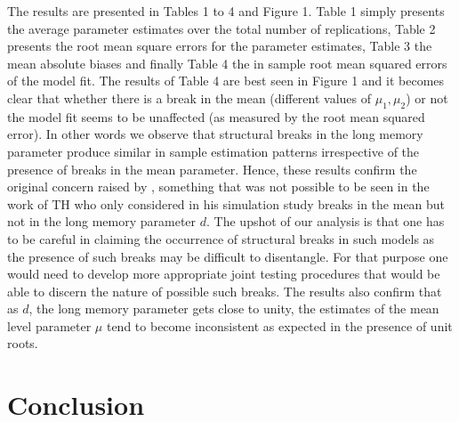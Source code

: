 \documentclass[11pt,fleqn]{article}
\begin{document}
{The results are presented in Tables 1 to 4 and Figure 1. Table 1 simply
presents the average parameter estimates over the total number of
replications, Table 2 presents the root mean square errors for the parameter
estimates, Table 3 the mean absolute biases and finally Table 4 the in
sample root mean squared errors of the model fit. The results of Table 4 are
best seen in Figure 1 and it becomes clear that whether there is a break in
the mean (different values of $\mu _{1},\mu _{2}$) or not the model fit
seems to be unaffected (as measured by the root mean squared error). In
other words we observe that structural breaks in the long memory parameter
produce similar in sample estimation patterns irrespective of the presence
of breaks in the mean parameter. Hence, these results confirm the original
concern raised by \cite{Diebold2001}, something that was not possible to be
seen in the work of TH who only considered in his simulation study breaks in
the mean but not in the long memory parameter $d.$ The upshot of our
analysis is that one has to be careful in claiming the occurrence of
structural breaks in such models as the presence of such breaks may be
difficult to disentangle. For that purpose one would need to develop more
appropriate joint testing procedures that would be able to discern the
nature of possible such breaks. The results also confirm that as $d$, 
the long memory parameter gets close to unity, the estimates of
the mean level parameter $\mu $ tend to become inconsistent as
expected in the presence of unit roots.

\section{Conclusion}

}
\end{document}
